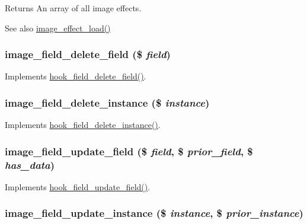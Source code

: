 \begin{DoxyReturn}{Returns}
An array of all image effects. 
\end{DoxyReturn}
\begin{DoxySeeAlso}{See also}
\hyperlink{image_8module_a7ad62224057dbc7757dfa2df898926ad}{image\_\-effect\_\-load()} 
\end{DoxySeeAlso}
\hypertarget{image_8module_a61fe19440569b6eb7fd3a61f34e4ebfd}{
\subsubsection[{image\_\-field\_\-delete\_\-field}]{\setlength{\rightskip}{0pt plus 5cm}image\_\-field\_\-delete\_\-field (\$ {\em field})}}
\label{image_8module_a61fe19440569b6eb7fd3a61f34e4ebfd}
Implements \hyperlink{group__field__crud_gacc586bd79943816012827d165b668aab}{hook\_\-field\_\-delete\_\-field()}. \hypertarget{image_8module_a0e5f193a0ecbe7dac74a86f0f7ea5f8b}{
\subsubsection[{image\_\-field\_\-delete\_\-instance}]{\setlength{\rightskip}{0pt plus 5cm}image\_\-field\_\-delete\_\-instance (\$ {\em instance})}}
\label{image_8module_a0e5f193a0ecbe7dac74a86f0f7ea5f8b}
Implements \hyperlink{group__field__crud_gae351ac9408b7c2e8bfefd9ebca5ab7f5}{hook\_\-field\_\-delete\_\-instance()}. \hypertarget{image_8module_ae1d89a3e614972588adf70b46109571a}{
\subsubsection[{image\_\-field\_\-update\_\-field}]{\setlength{\rightskip}{0pt plus 5cm}image\_\-field\_\-update\_\-field (\$ {\em field}, \/  \$ {\em prior\_\-field}, \/  \$ {\em has\_\-data})}}
\label{image_8module_ae1d89a3e614972588adf70b46109571a}
Implements \hyperlink{group__field__crud_ga4f06c14e6fb60ec1903c005ddbb4ee83}{hook\_\-field\_\-update\_\-field()}. \hypertarget{image_8module_a3ee06b052a9a2a8372874966c24fbca7}{
\subsubsection[{image\_\-field\_\-update\_\-instance}]{\setlength{\rightskip}{0pt plus 5cm}image\_\-field\_\-update\_\-instance (\$ {\em instance}, \/  \$ {\em prior\_\-instance})}}
